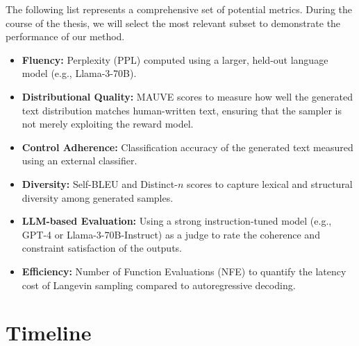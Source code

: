 \documentclass[11pt]{article}
\begin{document}

The following list represents a comprehensive set of potential metrics. During the course of the thesis, we will select the most relevant subset to demonstrate the performance of our method.

\begin{itemize}
    \item \textbf{Fluency:} Perplexity (PPL) computed using a larger, held-out language model (e.g., Llama-3-70B).
    \item \textbf{Distributional Quality:} MAUVE scores to measure how well the generated text distribution matches human-written text, ensuring that the sampler is not merely exploiting the reward model.
    \item \textbf{Control Adherence:} Classification accuracy of the generated text measured using an external classifier.
    \item \textbf{Diversity:} Self-BLEU and Distinct-$n$ scores to capture lexical and structural diversity among generated samples.
    \item \textbf{LLM-based Evaluation:} Using a strong instruction-tuned model (e.g., GPT-4 or Llama-3-70B-Instruct) as a judge to rate the coherence and constraint satisfaction of the outputs.
    \item \textbf{Efficiency:} Number of Function Evaluations (NFE) to quantify the latency cost of Langevin sampling compared to autoregressive decoding.
\end{itemize}



\section{Timeline}
\end{document}
